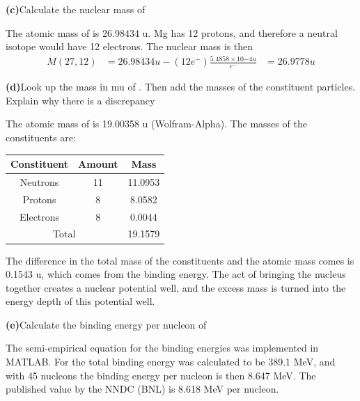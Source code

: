 \documentclass[11pt]{article}
\renewcommand{\part}[1] {\vspace{.10in} {\bf (#1)}}
\begin{document}
\part{c}{Calculate the nuclear mass of }

The atomic mass of  is 26.98434 u. Mg has 12 protons, and therefore a neutral isotope would have 12 electrons.
The nuclear mass is then
\begin{align}
	M(27,12) &= 26.98434 u - (12e^-)\frac{5.4858\times10{-4} u}{e^-}
				&= 26.9778 u
\end{align}

\part{d}{Look up the mass in mu of . Then add the masses of the constituent particles. Explain why there is a discrepancy}

The atomic mass of  is 19.00358 u (Wolfram-Alpha).
The masses of the constituents are:
\begin{center}
	\begin{tabular}{c c c}
	Constituent & Amount & Mass \\
	\hline
	\hline
	Neutrons & 11 & 11.0953 \\
	Protons & 8 & 8.0582 \\
	Electrons & 8 & 0.0044 \\ 
	\multicolumn{2}{c}{Total} & 19.1579
\end{tabular}
\end{center}
The difference in the total mass of the constituents and the atomic mass comes is 0.1543 u, which comes from the binding energy.
The act of bringing the nucleus together creates a nuclear potential well, and the excess mass is turned into the energy depth of this potential well.

\part{e}{Calculate the binding energy per nucleon of }

The semi-empirical equation for the binding energies was implemented in MATLAB. For  the total binding energy was calculated to be 389.1 MeV, and with 45 nucleons the binding energy per nucleon is then 8.647 MeV. The published value by the NNDC (BNL) is 8.618 MeV per nucleon.
\end{document}
